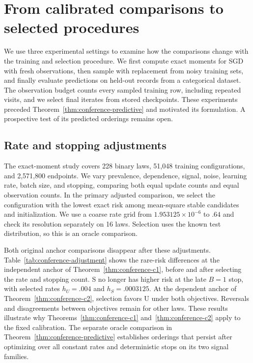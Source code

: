 \section{From calibrated comparisons to selected procedures}
\label{sec:conference-experiments}

We use three experimental settings to examine how the comparisons change with
the training and selection procedure. We first compute exact moments for SGD
with fresh observations, then sample with replacement from noisy training sets,
and finally evaluate predictions on held-out records from a categorical dataset.
The observation budget counts every sampled training row, including repeated
visits, and we select final iterates from stored checkpoints. These experiments
preceded Theorem~\ref{thm:conference-predictive} and motivated its formulation.
A prospective test of its predicted orderings remains open.

\subsection{Rate and stopping adjustments}

The exact-moment study covers 228 binary laws, 51,048 training configurations,
and 2,571,800 endpoints. We vary prevalence, dependence, signal, noise, learning
rate, batch size, and stopping, comparing both equal update counts and equal
observation counts. In the primary adjusted comparison, we select the
configuration with the lowest exact risk among mean-square stable candidates
and initialization. We use a coarse rate grid from
$1.953125 \times 10^{-6}$ to $.64$ and check its resolution separately on 16
laws. Selection uses the known test distribution, so this is an oracle
comparison.

Both original anchor comparisons disappear after these adjustments.
Table~\ref{tab:conference-adjustment} shows the rare-risk differences at the
independent anchor of Theorem~\ref{thm:conference-c1}, before and after selecting
the rate and stopping count. S no longer has higher risk at the late $B = 1$
stop, with selected rates $h_U = .004$ and $h_S = .0003125$. At the dependent
anchor of Theorem~\ref{thm:conference-c2}, selection favors U under both
objectives. Reversals and disagreements between objectives remain for other
laws. These results illustrate why Theorems~\ref{thm:conference-c1}
and~\ref{thm:conference-c2} apply to the fixed calibration. The separate oracle
comparison in Theorem~\ref{thm:conference-predictive} establishes orderings that
persist after optimizing over all constant rates and deterministic stops on its
two signal families.

